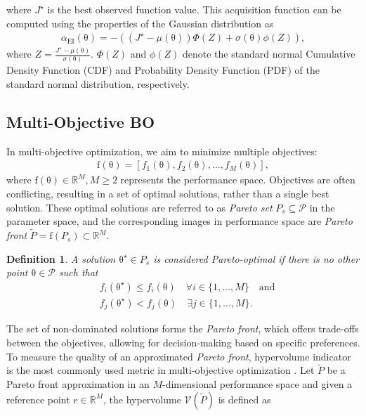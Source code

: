 \documentclass[10pt,twocolumn,twoside]{IEEEtran}
\newcommand{\vect}[1]{\ensuremath{\boldsymbol{\mathrm{#1}}}}
\newtheorem{Definition}{Definition}
\begin{document}
where $J^\star$ is the best observed function value. This acquisition function can be computed using the properties of the Gaussian distribution as
\begin{align}\label{eq:acq_EI}
  \alpha_{\text{EI}}(\vect{\theta}) =-\left( \left(J^\star - \mu(\vect{\theta})\right) \Phi(Z) + \sigma(\vect{\theta}) \phi(Z)\right),  
\end{align}
where $Z = \frac{J^\star - \mu(\vect{\theta})}{\sigma(\vect{\theta})}$. $\Phi(Z)$ and $\phi(Z)$ denote the standard normal Cumulative Density Function (CDF) and Probability Density Function (PDF) of the standard normal distribution, respectively.
\subsection{Multi-Objective BO}
In multi-objective optimization, we aim to minimize multiple objectives:
\begin{align}\label{eq:objs}
   \vect{f}(\vect{\theta}) = [f_1(\vect{\theta}), f_2(\vect{\theta}), \ldots, f_M(\vect{\theta})], 
\end{align}
where $\vect{f}(\vect{\theta}) \in \mathbb{R}^M,M\geq 2$ represents the performance space. Objectives are often conflicting, resulting in a set of optimal solutions, rather than a single best solution. These optimal solutions are referred to as \textit{Pareto set} $P_s\subseteq\mathcal{P}$ in the parameter space, and the corresponding images in performance space are \textit{Pareto front} $\tilde P=\vect f(P_s)\subset\mathbb{R}^M$. 
\begin{Definition}
A solution $\vect\theta^\star\in P_s$ is considered \textit{Pareto-optimal} if there is no other point $\vect\theta\in\mathcal{P}$ such that 
\begin{align}
   &f_i(\vect{\theta}^\star) \leq f_i(\vect{\theta}) \quad \forall i \in \{1, \ldots, M\} \quad \text{and}\\\nonumber
   &f_j(\vect{\theta}^\star) < f_j(\vect{\theta})\quad\exists j \in \{1, \ldots, M\} .
\end{align}
\end{Definition}
The set of non-dominated solutions forms the \textit{Pareto front}, which offers trade-offs between the objectives, allowing for decision-making based on specific preferences. To measure the quality of an approximated \textit{Pareto front}, hypervolume indicator is the most commonly used metric in multi-objective optimization \cite{7360024}. Let $\tilde P$ be a Pareto front approximation in an $M$-dimensional performance space and given a reference point $r\in\mathbb{R}^M$, the hypervolume $\mathcal{V}(\tilde P)$ is defined as
\end{document}
